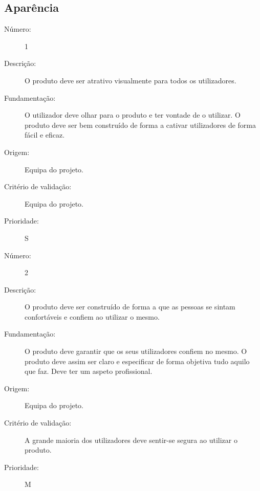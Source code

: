 \documentclass[12pt,a4paper]{article}
\begin{document}
  \subsection{Aparência}

            \begin{description}
        \item[Número:]1
        \item[Descrição:]O produto deve ser atrativo visualmente para todos os utilizadores.
        \item[Fundamentação:]O utilizador deve olhar para o produto e ter vontade de o utilizar. O produto deve ser bem construído de forma a cativar utilizadores de forma fácil e eficaz. 
        \item[Origem:] Equipa do projeto.
        \item[Critério de validação:] Equipa do projeto.
        \item[Prioridade:]S
      \end{description}
      \vspace{0.5cm}
            \begin{description}
        \item[Número:]2
        \item[Descrição:]O produto deve ser construído de forma a que as pessoas se sintam confortáveis e confiem ao utilizar o mesmo. 
        \item[Fundamentação:]O produto deve garantir que os seus utilizadores confiem no mesmo. O produto deve assim ser claro e especificar de forma objetiva tudo aquilo que faz. Deve ter um aspeto profissional.
        \item[Origem:]Equipa do projeto.
        \item[Critério de validação:]A grande maioria dos utilizadores deve sentir-se segura ao utilizar o produto.
        \item[Prioridade:]M
      \end{description}
\end{document}
